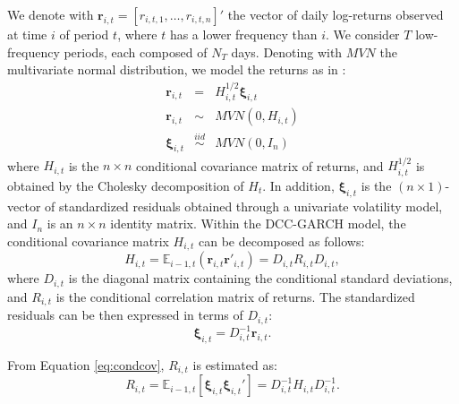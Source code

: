 	
	We denote with $\mathbf{r}_{i,t}=[r_{i,t,1}, \dots, r_{i,t,n}]'$ the vector of daily log-returns observed at time $i$ of period $t$, where $t$ has a lower frequency than $i$. We consider $T$ low-frequency periods, each composed of $N_T$ days. Denoting with $MVN$ the multivariate normal distribution, we model the returns as in \cite{Engle:2002b}:	
	\begin{eqnarray} 
	\bm{r}_{i,t} &=& H_{i,t}^{1/2} \bm{\xi}_{i,t}\\
	\bm{r}_{i,t}& \sim & MVN(0,H_{i,t}) \label{eq:gen_mod}\\
	\bm{\xi}_{i,t} &\overset{iid}{\sim}&MVN(0,I_n) \label{eq:resdistr}
	\end{eqnarray}
	where $H_{i,t}$ is the $n \times n$ conditional covariance matrix of returns, and $H_{i,t}^{1/2}$ is obtained by the Cholesky decomposition of $H_t$.
	In addition, $\bm{\xi}_{i,t}$ is the $(n \times 1)$-vector of standardized residuals obtained through a univariate volatility model, and $I_n$ is an $n \times n$ identity matrix. Within the DCC-GARCH model, the conditional covariance matrix $H_{i,t}$ can be decomposed as follows:
\begin{equation}
	\label{eq:condcov}
H_{i,t} = \mathbb{E}_{i-1,t}(\bm{r}_{i,t}\bm{r}'_{i,t})=D_{i,t}R_{i,t}D_{i,t},  
\end{equation}
where $D_{i,t}$ is the diagonal matrix containing the conditional standard deviations, and $R_{i,t}$ is the conditional correlation matrix of returns. The standardized residuals can be then expressed in terms of $D_{i,t}$: 
\begin{equation}
	\bm{\xi}_{i,t} = D_{i,t}^{-1}\bm{r}_{i,t}.   \label{eq:corr_it_2}
\end{equation}

From Equation \eqref{eq:condcov}, $R_{i,t}$ is estimated as:
\begin{equation}
R_{i,t}  =\mathbb{E}_{i-1,t}[\bm{\xi}_{i,t} \bm{\xi}_{i,t}' ] = D_{i,t}^{-1}H_{i,t} D_{i,t}^{-1}  \label{eq:corr_it_2}.
\end{equation}

